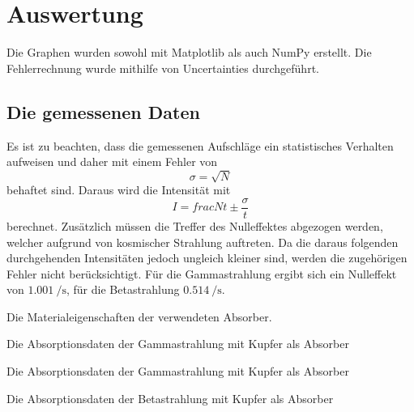 \section{Auswertung}
\label{sec:Auswertung}


Die Graphen wurden sowohl mit Matplotlib \cite{matplotlib} als auch NumPy \cite{numpy} erstellt. Die
Fehlerrechnung wurde mithilfe von Uncertainties \cite{uncertainties} durchgeführt.

\subsection{Die gemessenen Daten}
Es ist zu beachten, dass die gemessenen Aufschläge ein statistisches Verhalten
aufweisen und daher mit einem Fehler von
\begin{equation}
\sigma = \sqrt{N}
\end{equation}
behaftet sind. Daraus wird die Intensität mit
\begin{equation}
  I = frac{N}{t} \pm \frac{\sigma}{t}
\end{equation}
 berechnet. Zusätzlich müssen die Treffer des Nulleffektes abgezogen werden,
welcher aufgrund von kosmischer Strahlung auftreten. Da die daraus folgenden
durchgehenden Intensitäten jedoch ungleich kleiner sind, werden die zugehörigen
 Fehler nicht berücksichtigt. Für die Gammastrahlung ergibt sich ein
 Nulleffekt von $\SI{1.001}{\per\second}$, für die Betastrahlung $\SI{0.514}{\per\second}$.

 \begin{table}
  \centering
  \caption{Die Materialeigenschaften der verwendeten Absorber.}
  
  \label{tab:rohdaten}
 \end{table}

\begin{table}
 \centering
 \caption{Die Absorptionsdaten der Gammastrahlung mit Kupfer als Absorber }
 
 \label{tab:k}
\end{table}

\begin{table}
 \centering
 \caption{Die Absorptionsdaten der Gammastrahlung mit Kupfer als Absorber }
 
 \label{tab:e}
\end{table}

\begin{table}
 \centering
 \caption{Die Absorptionsdaten der Betastrahlung mit Kupfer als Absorber }
 
 \label{tab:betaJ}
\end{table}

